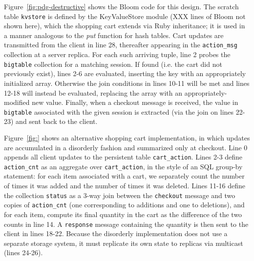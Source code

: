 Figure~\ref{fig:pdg-destructive} shows the Bloom code for this design.
The 
scratch table \texttt{kvstore} is defined by the KeyValueStore module (XXX lines of Bloom not shown here), 
which the shopping cart extends via Ruby inheritance; it is used in a manner
analogous to the \emph{put} function for hash tables.  
Cart updates are transmitted from the client in line 28,
thereafter appearing in the \texttt{action\_msg} collection at a server replica.
For each such arriving tuple,
line 2 probes the \texttt{bigtable} collection for a matching
session.  If found (i.e. the cart did not previously exist), lines 2-6 are evaluated, inserting
the key with an appropriately initialized array. 
Otherwise the join conditions
in lines 10-11 will be met and lines 12-18 will instead be evaluated, replacing the array
with an appropriately-modified new value.
Finally, when a checkout message is received, the value in \texttt{bigtable}
associated with the given session is extracted (via the join on lines 22-23)
and sent back to the client.

Figure~\ref{fig:} shows an alternative shopping cart implementation, in which
updates are accumulated in a disorderly fashion and summarized only at 
checkout.  Line 0 appends all client updates to the persistent table 
\texttt{cart\_action}.  Lines 2-3 define \texttt{action\_cnt} as an aggregate
over \texttt{cart\_action}, in the style of an SQL group-by statement: for
each item associated with a cart, we separately count the number of times it was added and the number of times it was deleted.
Lines 11-16 define the collection \texttt{status} as a 3-way
join between the \texttt{checkout} message and two copies of 
\texttt{action\_cnt} (one corresponding to additions and one to deletions),
and for each item, compute its final quantity in the cart as the difference of the two counts
in line 14.  A \texttt{response} message containing the quantity is then sent 
to the client in lines 18-22.  Because the disorderly implementation does not
use a separate storage system, it must replicate its own state to replicas 
via multicast (lines 24-26).


